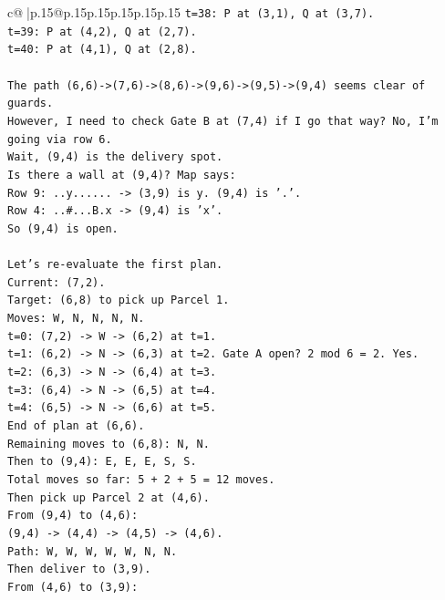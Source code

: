 \documentclass{article}
\begin{document}
{\begin{supertabular}{c@{$\;$}|p{.15\linewidth}@{}p{.15\linewidth}p{.15\linewidth}p{.15\linewidth}p{.15\linewidth}p{.15\linewidth}}
{{{\texttt{t=38: P at (3,1), Q at (3,7).} \\
\texttt{t=39: P at (4,2), Q at (2,7).} \\
\texttt{t=40: P at (4,1), Q at (2,8).} \\
\\ 
\texttt{The path (6,6){-}>(7,6){-}>(8,6){-}>(9,6){-}>(9,5){-}>(9,4) seems clear of guards.} \\
\texttt{However, I need to check Gate B at (7,4) if I go that way? No, I'm going via row 6.} \\
\texttt{Wait, (9,4) is the delivery spot.} \\
\texttt{Is there a wall at (9,4)? Map says:} \\
\texttt{Row 9: ..y...... {-}> (3,9) is y. (9,4) is '.'.} \\
\texttt{Row 4: ..\#...B.x {-}> (9,4) is 'x'.} \\
\texttt{So (9,4) is open.} \\
\\ 
\texttt{Let's re{-}evaluate the first plan.} \\
\texttt{Current: (7,2).} \\
\texttt{Target: (6,8) to pick up Parcel 1.} \\
\texttt{Moves: W, N, N, N, N.} \\
\texttt{t=0: (7,2) {-}> W {-}> (6,2) at t=1.} \\
\texttt{t=1: (6,2) {-}> N {-}> (6,3) at t=2. Gate A open? 2 mod 6 = 2. Yes.} \\
\texttt{t=2: (6,3) {-}> N {-}> (6,4) at t=3.} \\
\texttt{t=3: (6,4) {-}> N {-}> (6,5) at t=4.} \\
\texttt{t=4: (6,5) {-}> N {-}> (6,6) at t=5.} \\
\texttt{End of plan at (6,6).} \\
\texttt{Remaining moves to (6,8): N, N.} \\
\texttt{Then to (9,4): E, E, E, S, S.} \\
\texttt{Total moves so far: 5 + 2 + 5 = 12 moves.} \\
\texttt{Then pick up Parcel 2 at (4,6).} \\
\texttt{From (9,4) to (4,6):} \\
\texttt{(9,4) {-}> (4,4) {-}> (4,5) {-}> (4,6).} \\
\texttt{Path: W, W, W, W, W, N, N.} \\
\texttt{Then deliver to (3,9).} \\
\texttt{From (4,6) to (3,9):} \\
}}}
\end{supertabular}}
\end{document}
